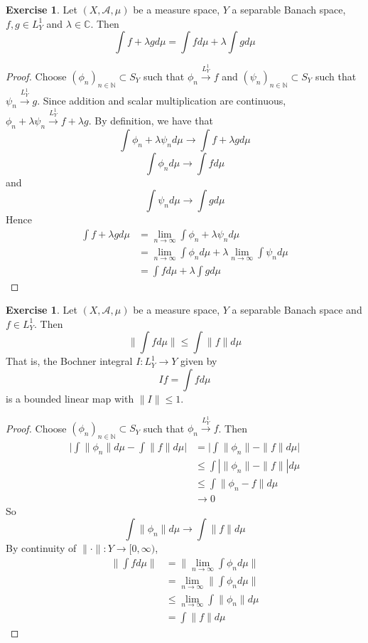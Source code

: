 \documentclass[12pt]{amsart}
\theoremstyle{definition}
\newtheorem{ex}[definition]{Exercise}
\newcommand{\lam}{\lambda}
\newcommand{\C}{\mathbb{C}}
\newcommand{\N}{\mathbb{N}}
\newcommand{\MA}{\mathcal{A}}
\newcommand{\Rg}{[0,\infty)}
\newcommand{\limn}{\lim \limits_{n \rightarrow \infty}}
\newcommand{\conv}[1]{\xrightarrow{#1}}
\newcommand{\lex}[1]{\label{ex:#1}}
\begin{document}
	\begin{ex} \lex{00000} 
	Let $(X, \MA, \mu)$ be a measure space, $Y$ a separable Banach space, $f,g \in L^1_Y$ and $\lam \in \C$. Then $$\int f+\lam g d\mu = \int f d \mu + \lam \int g d\mu$$
	\end{ex}
	
	\begin{proof}
	Choose $(\phi_n)_{n \in \N} \subset S_Y$ such that $\phi_n \conv{L^1_Y} f$ and $(\psi_n)_{n \in \N} \subset S_Y$ such that $\psi_n \conv{L^1_Y} g$. Since addition and  scalar multiplication are continuous, $\phi_n + \lam \psi_n \conv{L^1_Y} f+\lam g$. By definition, we have that $$\int \phi_n + \lam \psi_n  d\mu \rightarrow \int f+\lam g d\mu $$ $$\int \phi_n d\mu \rightarrow \int f d\mu$$ and $$ \int \psi_n d\mu \rightarrow \int g d\mu$$ 
	Hence 
	\begin{align*}
	\int f+ \lam g d\mu 
	&= \limn \int \phi_n + \lam \psi_n  d\mu \\
	&= \limn \int \phi_n d\mu + \lam \limn \int \psi_n  d\mu \\
	&= \int f d\mu + \lam \int g d\mu
	\end{align*}
	\end{proof}
	
	\begin{ex} \lex{00000} 
	Let $(X, \MA, \mu)$ be a measure space, $Y$ a separable Banach space and $f \in L^1_Y$. Then $$\bigg \|\int f d\mu \bigg \| \leq \int \|f\| d\mu$$ That is, the Bochner integral $I: L^1_Y \rightarrow Y$ given by $$If = \int f d\mu$$ is a bounded linear map with $\|I\| \leq 1$.
	\end{ex}
	
	\begin{proof}
	Choose $(\phi_n)_{n \in \N} \subset S_Y$ such that $\phi_n \conv{L^1_Y} f$. Then 
	\begin{align*}
	\bigg | \int \| \phi_n \| d \mu - \int \| f\| d\mu \bigg |
	&= \bigg | \int \| \phi_n \| - \| f\| d\mu \bigg | \\
	& \leq \int |\| \phi_n \| - \| f\| | d\mu \\
	& \leq  \int \| \phi_n - f\| d\mu \\
	& \rightarrow 0
	\end{align*}
	So  $$ \int \| \phi_n \| d \mu \rightarrow  \int \| f \| d \mu$$
	By continuity of $\|\cdot\|:Y \rightarrow \Rg$,
	\begin{align*}
	\bigg \| \int f d\mu \bigg \|
	&= \bigg \| \limn \int \phi_n d\mu \bigg \| \\
	&= \limn  \bigg \| \int \phi_n d\mu \bigg \| \\
	& \leq \limn \int \| \phi_n \| d \mu \\
	&= \int \| f \| d\mu  
	\end{align*}
	\end{proof}
	
\end{document}
